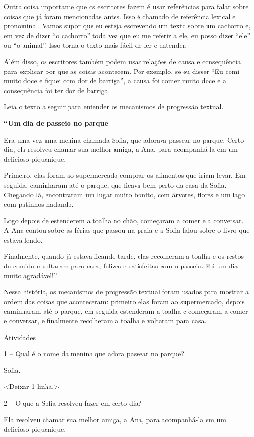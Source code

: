 Outra coisa importante que os escritores fazem é usar referências para
falar sobre coisas que já foram mencionadas antes. Isso é chamado de
referência lexical e pronominal. Vamos supor que eu esteja escrevendo um
texto sobre um cachorro e, em vez de dizer ``o cachorro'' toda vez que
eu me referir a ele, eu posso dizer ``ele'' ou ``o animal''. Isso torna
o texto mais fácil de ler e entender.

Além disso, os escritores também podem usar relações de causa e
consequência para explicar por que as coisas acontecem. Por exemplo, se
eu disser ``Eu comi muito doce e fiquei com dor de barriga'', a causa
foi comer muito doce e a consequência foi ter dor de barriga.

Leia o texto a seguir para entender os mecanismos de progressão textual.

\textbf{``Um dia de passeio no parque}

Era uma vez uma menina chamada Sofia, que adorava passear no parque.
Certo dia, ela resolveu chamar sua melhor amiga, a Ana, para
acompanhá-la em um delicioso piquenique.

Primeiro, elas foram ao supermercado comprar os alimentos que iriam
levar. Em seguida, caminharam até o parque, que ficava bem perto da casa
da Sofia. Chegando lá, encontraram um lugar muito bonito, com árvores,
flores e um lago com patinhos nadando.

Logo depois de estenderem a toalha no chão, começaram a comer e a
conversar. A Ana contou sobre as férias que passou na praia e a Sofia
falou sobre o livro que estava lendo.

Finalmente, quando já estava ficando tarde, elas recolheram a toalha e
os restos de comida e voltaram para casa, felizes e satisfeitas com o
passeio. Foi um dia muito agradável!''

Nessa história, os mecanismos de progressão textual foram usados para
mostrar a ordem das coisas que aconteceram: primeiro elas foram ao
supermercado, depois caminharam até o parque, em seguida estenderam a
toalha e começaram a comer e conversar, e finalmente recolheram a toalha
e voltaram para casa.

Atividades

1 -- Qual é o nome da menina que adora passear no parque?

Sofia.

\textless{}Deixar 1 linha.\textgreater{}

2 -- O que a Sofia resolveu fazer em certo dia?

Ela resolveu chamar sua melhor amiga, a Ana, para acompanhá-la em um
delicioso piquenique.

